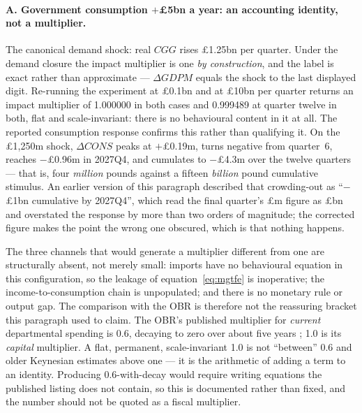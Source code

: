 \paragraph{A. Government consumption $+$\pounds 5bn a year: an accounting identity, not a multiplier.} The canonical demand shock: real $CGG$ rises \pounds 1.25bn per quarter. Under the demand closure the impact multiplier is one \emph{by construction}, and the label is exact rather than approximate --- $\Delta GDPM$ equals the shock to the last displayed digit. Re-running the experiment at \pounds 0.1bn and at \pounds 10bn per quarter returns an impact multiplier of 1.000000 in both cases and 0.999489 at quarter twelve in both, flat and scale-invariant: there is no behavioural content in it at all. The reported consumption response confirms this rather than qualifying it. On the \pounds 1{,}250m shock, $\Delta CONS$ peaks at $+$\pounds 0.19m, turns negative from quarter~6, reaches $-$\pounds 0.96m in 2027Q4, and cumulates to $-$\pounds 4.3m over the twelve quarters --- that is, four \emph{million} pounds against a fifteen \emph{billion} pound cumulative stimulus. An earlier version of this paragraph described that crowding-out as ``$-$\pounds 1bn cumulative by 2027Q4'', which read the final quarter's \pounds m figure as \pounds bn and overstated the response by more than two orders of magnitude; the corrected figure makes the point the wrong one obscured, which is that nothing happens.

The three channels that would generate a multiplier different from one are structurally absent, not merely small: imports have no behavioural equation in this configuration, so the leakage of equation~\eqref{eq:mgtfe} is inoperative; the income-to-consumption chain is unpopulated; and there is no monetary rule or output gap. The comparison with the OBR is therefore not the reassuring bracket this paragraph used to claim. The OBR's published multiplier for \emph{current} departmental spending is 0.6, decaying to zero over about five years \citep{obr2010multipliers}; 1.0 is its \emph{capital} multiplier. A flat, permanent, scale-invariant 1.0 is not ``between'' 0.6 and older Keynesian estimates above one --- it is the arithmetic of adding a term to an identity. Producing 0.6-with-decay would require writing equations the published listing does not contain, so this is documented rather than fixed, and the number should not be quoted as a fiscal multiplier.

